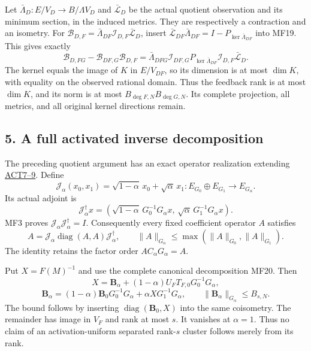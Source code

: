 \documentclass[11pt]{article}
\begin{document}
Let \(\bar\Lambda_D:E/V_D\to B/\Lambda V_D\) and \(\bar{\mathcal L}_D\) be the actual quotient observation and its minimum section, in the induced metrics. They are respectively a contraction and an isometry. For \(\mathcal B_{D,F}=\bar\Lambda_{DF}\mathcal I_{D,F}\bar{\mathcal L}_D\), insert \(\bar{\mathcal L}_{DF}\bar\Lambda_{DF}=I-P_{\ker\bar\Lambda_{DF}}\) into MF19. This gives exactly \[
\mathcal B_{D,FG}-\mathcal B_{DF,G}\mathcal B_{D,F}
=\bar\Lambda_{DFG}\mathcal I_{DF,G}
P_{\ker\bar\Lambda_{DF}}\mathcal I_{D,F}\bar{\mathcal L}_D.
\tag{MF23}
\] The kernel equals the image of \(K\) in \(E/V_{DF}\), so its dimension is at most \(\dim K\), with equality on the observed rational domain. Thus the feedback rank is at most \(\dim K\), and its norm is at most \(B_{\deg F,N}B_{\deg G,N}\). Its complete projection, all metrics, and all original kernel directions remain.

\subsection{5. A full activated inverse decomposition}\label{a-full-activated-inverse-decomposition}

The preceding quotient argument has an exact operator realization extending \href{https://github.com/KokunoYumeto/zeta-function-research-reader/blob/360d3c1d798da434966d35f7e407fc59c14f234b/workbenches/splitzero-tandem/continuations/20260921-critical-inverse-activation/ACTION_PROOFS.md\#L112}{ACT7--9}. Define \[
\mathcal J_\alpha(x_0,x_1)=\sqrt{1-\alpha}\,x_0+\sqrt\alpha\,x_1:
E_{G_0}\oplus E_{G_1}\to E_{G_\alpha}.
\] Its actual adjoint is \[
\mathcal J_\alpha^\dagger x=
(\sqrt{1-\alpha}\,G_0^{-1}G_\alpha x,\,
 \sqrt\alpha\,G_1^{-1}G_\alpha x).
\] MF3 proves \(\mathcal J_\alpha\mathcal J_\alpha^\dagger=I\). Consequently every fixed coefficient operator \(A\) satisfies \[
A=\mathcal J_\alpha\operatorname{diag}(A,A)\mathcal J_\alpha^\dagger,\qquad
\|A\|_{G_\alpha}\le\max(\|A\|_{G_0},\|A\|_{G_1}).
\tag{MF24}
\] The identity retains the factor order \(AC_\alpha G_\alpha=A\).

Put \(X=F(M)^{-1}\) and use the complete canonical decomposition MF20. Then \[
\boxed{
X=\mathbf B_\alpha+(1-\alpha)U_FT_{F,0}G_0^{-1}G_\alpha,}
\] \[
\mathbf B_\alpha=(1-\alpha)\mathbf B_0G_0^{-1}G_\alpha
+\alpha XG_1^{-1}G_\alpha,\qquad
\|\mathbf B_\alpha\|_{G_\alpha}\le B_{s,N}.
\tag{MF25}
\] The bound follows by inserting \(\operatorname{diag}(\mathbf B_0,X)\) into the same coisometry. The remainder has image in \(V_F\) and rank at most \(s\). It vanishes at \(\alpha=1\). Thus no claim of an activation-uniform separated rank-\(s\) cluster follows merely from its rank.
\end{document}

